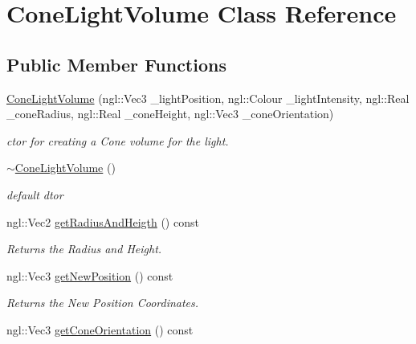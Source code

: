 \hypertarget{class_cone_light_volume}{\section{Cone\-Light\-Volume Class Reference}
\label{class_cone_light_volume}
}
\subsection*{Public Member Functions}
\begin{DoxyCompactItemize}
\item 
\hyperlink{class_cone_light_volume_ab8626d8dc7a7acaf9c5c499f5ee10c07}{Cone\-Light\-Volume} (ngl\-::\-Vec3 \-\_\-light\-Position, ngl\-::\-Colour \-\_\-light\-Intensity, ngl\-::\-Real \-\_\-cone\-Radius, ngl\-::\-Real \-\_\-cone\-Height, ngl\-::\-Vec3 \-\_\-cone\-Orientation)
\begin{DoxyCompactList}\small\item\em ctor for creating a Cone volume for the light. \end{DoxyCompactList}\item 
\hypertarget{class_cone_light_volume_ac3227dccbeb84973aba06381f5b3f750}{\hyperlink{class_cone_light_volume_ac3227dccbeb84973aba06381f5b3f750}{$\sim$\-Cone\-Light\-Volume} ()}\label{class_cone_light_volume_ac3227dccbeb84973aba06381f5b3f750}

\begin{DoxyCompactList}\small\item\em default dtor \end{DoxyCompactList}\item 
\hypertarget{class_cone_light_volume_a34d75c868c3797bb8d218ec4e4424231}{ngl\-::\-Vec2 \hyperlink{class_cone_light_volume_a34d75c868c3797bb8d218ec4e4424231}{get\-Radius\-And\-Heigth} () const }\label{class_cone_light_volume_a34d75c868c3797bb8d218ec4e4424231}

\begin{DoxyCompactList}\small\item\em Returns the Radius and Height. \end{DoxyCompactList}\item 
\hypertarget{class_cone_light_volume_a25eb3fece7c140c43c4672045773f408}{ngl\-::\-Vec3 \hyperlink{class_cone_light_volume_a25eb3fece7c140c43c4672045773f408}{get\-New\-Position} () const }\label{class_cone_light_volume_a25eb3fece7c140c43c4672045773f408}

\begin{DoxyCompactList}\small\item\em Returns the New Position Coordinates. \end{DoxyCompactList}\item 
\hypertarget{class_cone_light_volume_ab90a22c87d468647a6cce9a555c5b4be}{ngl\-::\-Vec3 \hyperlink{class_cone_light_volume_ab90a22c87d468647a6cce9a555c5b4be}{get\-Cone\-Orientation} () const }\label{class_cone_light_volume_ab90a22c87d468647a6cce9a555c5b4be}


\end{DoxyCompactItemize}
